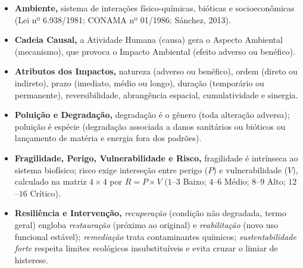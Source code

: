 \begin{boxResumo}
\begin{itemize}[leftmargin=1.5em, itemsep=2.2pt]
  \item \textbf{Ambiente,} sistema de interações físico-químicas, bióticas e socioeconômicas (Lei nº 6.938/1981; CONAMA nº 01/1986; Sánchez, 2013).
  \item \textbf{Cadeia Causal,} a Atividade Humana (causa) gera o Aspecto Ambiental (mecanismo), que provoca o Impacto Ambiental (efeito adverso ou benéfico).
  \item \textbf{Atributos dos Impactos,} natureza (adverso ou benéfico), ordem (direto ou indireto), prazo (imediato, médio ou longo), duração (temporário ou permanente), reversibilidade, abrangência espacial, cumulatividade e sinergia.
  \item \textbf{Poluição e Degradação,} degradação é o gênero (toda alteração adversa); poluição é espécie (degradação associada a danos sanitários ou bióticos ou lançamento de matéria e energia fora dos padrões).
  \item \textbf{Fragilidade, Perigo, Vulnerabilidade e Risco,} fragilidade é intrínseca ao sistema biofísico; risco exige interseção entre perigo ($P$) e vulnerabilidade ($V$), calculado na matriz $4 \times 4$ por $R = P \times V$ ($1$--$3$ Baixo; $4$--$6$ Médio; $8$--$9$ Alto; $12$--$16$ Crítico).
  \item \textbf{Resiliência e Intervenção,} \textit{recuperação} (condição não degradada, termo geral) engloba \textit{restauração} (próximo ao original) e \textit{reabilitação} (novo uso funcional estável); \textit{remediação} trata contaminantes químicos; \textit{sustentabilidade forte} respeita limites ecológicos insubstituíveis e evita cruzar o limiar de histerese.
\end{itemize}
\end{boxResumo}

